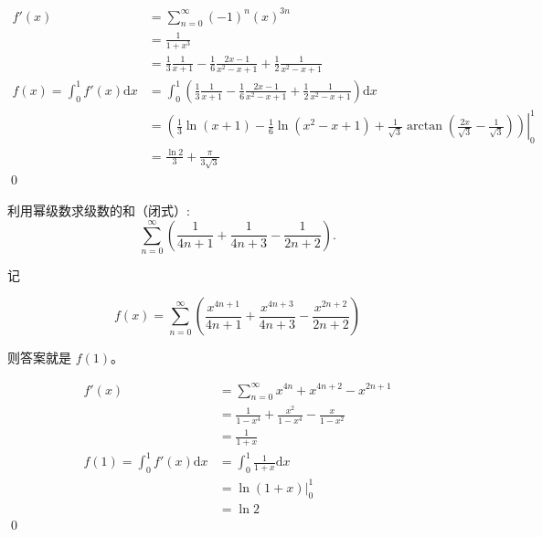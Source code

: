 \begin{align*}
	f'( x) & =\sum _{n=0}^{\infty } (-1)^{n} (x)^{3n}\\
	& =\frac{1}{1+x^{3}}\\
	& =\frac{1}{3}\frac{1}{x+1} -\frac{1}{6}\frac{2x-1}{x^{2} -x+1} +\frac{1}{2}\frac{1}{x^{2} -x+1}\\
	f( x) =\int _{0}^{1} f'( x)\mathrm{d} x & =\int _{0}^{1}\left(\frac{1}{3}\frac{1}{x+1} -\frac{1}{6}\frac{2x-1}{x^{2} -x+1} +\frac{1}{2}\frac{1}{x^{2} -x+1}\right)\mathrm{d} x\\
	& =\left. \left(\frac{1}{3}\ln( x+1) -\frac{1}{6}\ln\left( x^{2} -x+1\right) +\frac{1}{\sqrt{3}}\arctan\left(\frac{2x}{\sqrt{3}} -\frac{1}{\sqrt{3}}\right)\right)\right| _{0}^{1}\\
	& =\frac{\ln 2}{3} +\frac{\pi }{3\sqrt{3}}
\end{align*}
\qed 







\begin{ques}
利用幂级数求级数的和（闭式）:
\begin{equation*}
	\sum _{n=0}^{\infty }\left(\frac{1}{4n+1} +\frac{1}{4n+3} -\frac{1}{2n+2}\right) .
\end{equation*}
\end{ques}


记


\begin{equation*}
	f( x) =\sum _{n=0}^{\infty }\left(\frac{x^{4n+1}}{4n+1} +\frac{x^{4n+3}}{4n+3} -\frac{x^{2n+2}}{2n+2}\right)
\end{equation*}


则答案就是 $\displaystyle f( 1)$。




\begin{align*}
	f'( x) & =\sum _{n=0}^{\infty } x^{4n} +x^{4n+2} -x^{2n+1}\\
	& =\frac{1}{1-x^{4}} +\frac{x^{2}}{1-x^{4}} -\frac{x}{1-x^{2}}\\
	& =\frac{1}{1+x}\\
	f( 1) =\int _{0}^{1} f'( x)\mathrm{d} x & =\int _{0}^{1}\frac{1}{1+x}\mathrm{d} x\\
	& =\ln( 1+x) | _{0}^{1}\\
	& =\ln 2
\end{align*}
\qed 



\ifx\allfiles\undefined

\fi